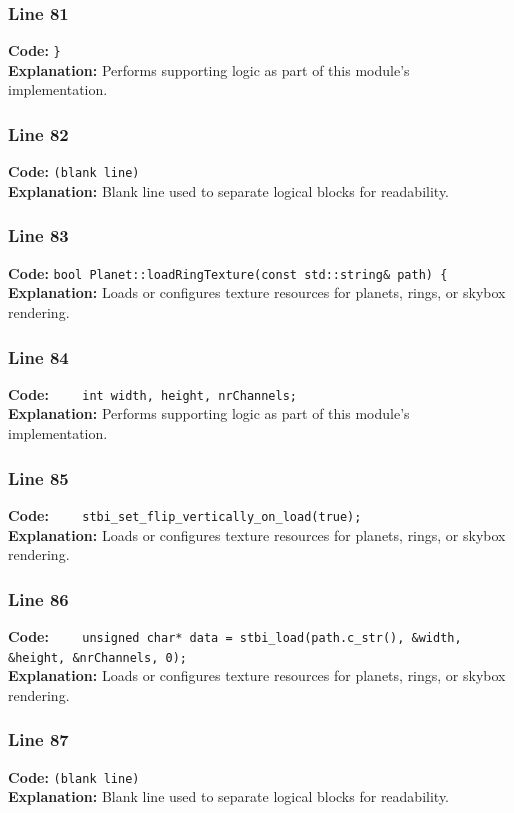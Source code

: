 \documentclass[11pt,a4paper]{article}
\begin{document}
\subsubsection*{Line 81}
\textbf{Code:} \verb|}|\\
\textbf{Explanation:} Performs supporting logic as part of this module's implementation.

\subsubsection*{Line 82}
\textbf{Code:} \texttt{(blank line)}\\
\textbf{Explanation:} Blank line used to separate logical blocks for readability.

\subsubsection*{Line 83}
\textbf{Code:} \verb|bool Planet::loadRingTexture(const std::string& path) {|\\
\textbf{Explanation:} Loads or configures texture resources for planets, rings, or skybox rendering.

\subsubsection*{Line 84}
\textbf{Code:} \verb|    int width, height, nrChannels;|\\
\textbf{Explanation:} Performs supporting logic as part of this module's implementation.

\subsubsection*{Line 85}
\textbf{Code:} \verb|    stbi_set_flip_vertically_on_load(true);|\\
\textbf{Explanation:} Loads or configures texture resources for planets, rings, or skybox rendering.

\subsubsection*{Line 86}
\textbf{Code:} \verb|    unsigned char* data = stbi_load(path.c_str(), &width, &height, &nrChannels, 0);|\\
\textbf{Explanation:} Loads or configures texture resources for planets, rings, or skybox rendering.

\subsubsection*{Line 87}
\textbf{Code:} \texttt{(blank line)}\\
\textbf{Explanation:} Blank line used to separate logical blocks for readability.
\end{document}
